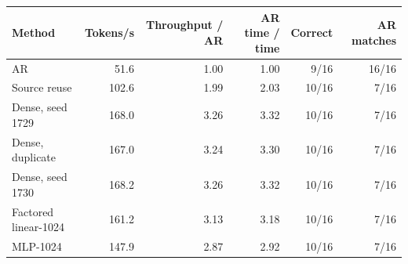 \begin{tabular}{lrrrrr}
\toprule
Method & Tokens/s & Throughput / AR & AR time / time & Correct & AR matches \\
\midrule
AR & 51.6 & 1.00 & 1.00 & 9/16 & 16/16 \\
Source reuse & 102.6 & 1.99 & 2.03 & 10/16 & 7/16 \\
Dense, seed 1729 & 168.0 & 3.26 & 3.32 & 10/16 & 7/16 \\
Dense, duplicate & 167.0 & 3.24 & 3.30 & 10/16 & 7/16 \\
Dense, seed 1730 & 168.2 & 3.26 & 3.32 & 10/16 & 7/16 \\
Factored linear-1024 & 161.2 & 3.13 & 3.18 & 10/16 & 7/16 \\
MLP-1024 & 147.9 & 2.87 & 2.92 & 10/16 & 7/16 \\
\bottomrule
\end{tabular}
